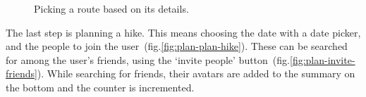 \begin{figure}[h!]
    \centering
    \hfill
    \hfill
    \caption{Picking a route based on its details.}
    \label{fig:plan-pick-route}
\end{figure}

The last step is planning a hike.
This means choosing the date with a date picker, and the people to join the user~(fig.\ref{fig:plan-plan-hike}).
These can be searched for among the user's friends, using the `invite people' button~(fig.\ref{fig:plan-invite-friends}).
While searching for friends, their avatars are added to the summary on the bottom and the counter is incremented.

